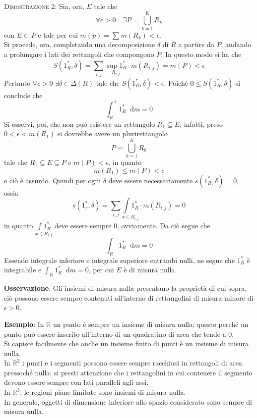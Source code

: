 \documentclass[a4paper]{extarticle}
\newcommand*\dif{\mathop{}\!\mathrm{d}}
\begin{document}
\vspace{2em}
\noindent
\normalfont \normalsize
\textsc{Dimostrazione 2}: Sia, ora, $E$ tale che
\[\forall \epsilon > 0 \hspace{1em} \exists P = \bigcup_{k=1}^K R_k\]
con $E \subset P$ e tale per cui $\displaystyle{m(p) = \sum m(R_k) < \epsilon}$.\\
Si procede, ora, completando una decomposizione $\delta$ di $R$ a partire da $P$, andando a prolungare i lati dei rettangoli che compongono $P$. In questo modo si ha che
\[S(1^*_R,\delta) = \sum_{i,j} \underset{R_{i,j}}{\sup 1^*_R} \cdot m(R_{i,j}) = m(P) < \epsilon\]
Pertanto $\forall \epsilon>0$ $\exists \delta \in \Delta(R)$ tale che $S(1^*_R, \delta) < \epsilon$. Poiché $0 \leq S(1^*_R,\delta)$ si conclude che
\[\int_R^+ 1^*_R \dif m = 0\]
Si osservi, poi, che non può esistere un rettangolo $R_1 \subseteq E$; infatti, preso $0 < \epsilon < m(R_1)$ si dovrebbe avere un plurirettangolo
\[P=\bigcup_{k=1}^K R_k\]
tale che $R_1 \subseteq E \subseteq P$ e $m(P) < \epsilon$, in quanto
\[m(R_1) \leq m(P) < \epsilon\]
e ciò è assurdo. Quindi per ogni $\delta$ deve essere necessariamente $s(1^*_R,\delta)=0$, ossia
\[s(1^*_r,\delta) = \sum_{i,j} \underset{x \in R_{i,j}}{\int 1^*_R} \cdot m(R_{i,j}) = 0\]
in quanto $\underset{x \in R_{i,j}}{\int 1^*_R}$ deve essere sempre $0$, ovviamente. Da ciò segue che
\[\int_R^- 1^*_R \dif m = 0\]
Essendo integrale inferiore e integrale superiore entrambi nulli, ne segue che $1^*_R$ è integrabile e $\displaystyle{\int_R 1^*_R \dif m = 0}$, per cui $E$ è di misura nulla.

\vspace{1em}
\noindent
\textbf{Osservazione}: Gli insiemi di misura nulla presentano la proprietà di cui sopra, ciò possono essere sempre contenuti all'interno di rettangolini di misura minore di $\epsilon > 0$.

\vspace{1em}
\noindent
\textbf{Esempio}: In $\mathbb{R}$ un punto è sempre un insieme di misura nulla; questo perché un punto può essere inserito all'interno di un quadratino di area che tende a $0$.\\
Si capisce facilmente che anche un insieme finito di punti è un insieme di misura nulla.\\
In $\mathbb{R}^2$ i punti e i segmenti possono essere sempre racchiusi in rettangoli di area pressoché nulla: si presti attenzione che i rettangolini in cui contenere il segmento devono essere sempre con lati paralleli agli assi.\\
In $\mathbb{R}^3$, le regioni piane limitate sono insiemi di misura nulla.\\
In generale, oggetti di dimensione inferiore allo spazio considerato sono sempre di misura nulla.
\end{document}
